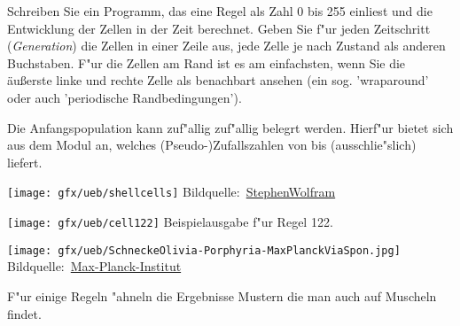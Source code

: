 \begin{enumerate}[1.]
Schreiben Sie ein Programm, das eine Regel als Zahl 0 bis 255 
einliest und die Entwicklung der Zellen in der Zeit berechnet. Geben Sie
f"ur jeden Zeitschritt ({\em Generation}) die Zellen in einer Zeile aus,
jede Zelle je nach Zustand als anderen Buchstaben.
F"ur die Zellen am Rand ist es am einfachsten, wenn Sie die äußerste linke und 
rechte Zelle als benachbart ansehen (ein sog. 'wraparound' oder auch 'periodische Randbedingungen').

Die Anfangspopulation kann zuf"allig zuf"allig belegrt werden. 
Hierf"ur bietet sich  aus
dem Modul  an, welches \mbox{(Pseudo-)}Zufalls\-zahlen
von  bis (ausschlie"slich)  liefert.

\begin{center}
\hfill
\begin{minipage}{0.3\textwidth}
  \begin{center}
    \texttt{[image: gfx/ueb/shellcells]}
  {\tiny Bildquelle:~\href{http://www.stephenwolfram.com/publications/articles/ca/83-cellular/2/text.html}{StephenWolfram}}
  \end{center}
\end{minipage}
\hfill
\begin{minipage}{0.3\textwidth}
  \begin{center}
    \texttt{[image: gfx/ueb/cell122]}
  {\tiny Beispielausgabe f"ur Regel 122.
}
  \end{center}
\end{minipage}
\hfill
\begin{minipage}{0.3\textwidth}
  \begin{center}
    \texttt{[image: gfx/ueb/SchneckeOlivia-Porphyria-MaxPlanckViaSpon.jpg]}
    {\tiny Bildquelle:~\href{http://www.spiegel.de/fotostrecke/fotostrecke-46503.html}{Max-Planck-Institut}} %
  \end{center}
\end{minipage}
\hfill
  \end{center}

F"ur einige Regeln "ahneln die Ergebnisse Mustern die man auch auf Muscheln findet.


\end{enumerate}

